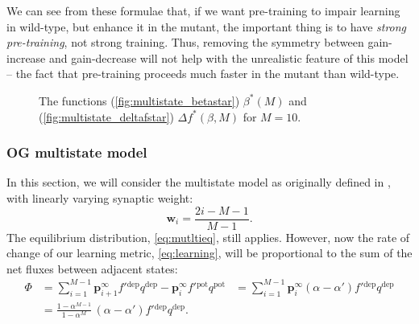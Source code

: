 \documentclass[12pt]{article}
\newcommand{\pr}{\mathbf{p}}
\newcommand{\eq}{\pr^\infty}
\newcommand{\w}{\mathbf{w}}
\newcommand{\pot}{^{\text{pot}}}
\newcommand{\dep}{^{\text{dep}}}
\begin{document}
We can see from these formulae that, if we want pre-training to impair learning in wild-type, but enhance it in the mutant, the important thing is to have \emph{strong pre-training}, not strong training.
Thus, removing the symmetry between gain-increase and gain-decrease will not help with the unrealistic feature of this model -- the fact that pre-training proceeds much faster in the mutant than wild-type.


\begin{figure}
 \begin{center}
 \begin{myenuma}
  \item{}\label{fig:multistate_betastar}
  \item{}\label{fig:multistate_deltafstar}
 \end{myenuma}
 \end{center}
  \caption{The functions (\ref{fig:multistate_betastar}) $\beta^*(M)$ and (\ref{fig:multistate_deltafstar}) $\Delta f^*(\beta,M)$ for $M=10$.}\label{fig:multistate_star}
\end{figure}



\subsubsection{OG multistate model}\label{sec:multistate_lin}

In this section, we will consider the multistate model as originally defined in \cite{amit1994learning}, \ie with linearly varying synaptic weight:
%
\begin{equation}\label{eq:multistateLinWeight}
  \w_i = \frac{2i-M-1}{M-1}.
\end{equation}
%
The equilibrium distribution, \eqref{eq:mutltieq}, still applies.
However, now the rate of change of our learning metric, \eqref{eq:learning}, will be proportional to the sum of the net fluxes between adjacent states:
%
\begin{equation}\label{eq:multiLinFlux}
  \begin{aligned}
    \Phi &= \sum_{i=1}^{M-1} \eq_{i+1} f'{}\dep q\dep - \eq_i f'{}\pot q\pot 
         &= \sum_{i=1}^{M-1} \eq_i (\alpha-\alpha') f'{}\dep q\dep \\
         &= \frac{1-\alpha^{M-1}}{1-\alpha^M} \, (\alpha-\alpha') f'{}\dep q\dep.
  \end{aligned}
\end{equation}
%
\end{document}
